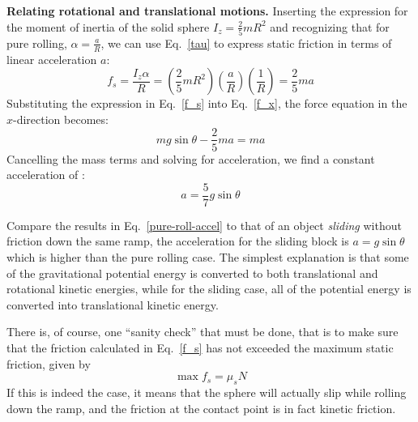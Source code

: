 \documentclass{../../../oss-handout}
\begin{document}
\textbf{Relating rotational and translational motions.} Inserting the
expression for the moment of inertia of the solid sphere
$\displaystyle I_z=\frac25 mR^2$
and recognizing that for pure rolling,
$\displaystyle\alpha=\frac{a}{R}$, we can use Eq.~\ref{tau} to express static
friction in terms of linear acceleration $a$:
\begin{equation}
  f_s=\frac{I_z\alpha}{R}=
  \left(\frac25 mR^2\right)
  \left(\frac{a}{R}\right)
  \left(\frac{1}{R}\right)=\frac25ma
  \label{f_s}
\end{equation}
Substituting the expression in Eq.~\ref{f_s} into Eq.~\ref{f_x}, the force
equation in the $x$-direction becomes:
\begin{equation}
  mg\sin\theta-\frac25 ma=ma
\end{equation}
Cancelling the mass terms and solving for acceleration, we find a constant
acceleration of :
\begin{equation}
  a=\frac57 g\sin\theta
  \label{pure-roll-accel}
\end{equation}

Compare the results in Eq.~\ref{pure-roll-accel} to that of an object
\emph{sliding} without friction down the same ramp, the acceleration for the
sliding block is $a=g\sin\theta$ which is higher than the pure rolling case.
The simplest explanation is that some of the gravitational potential energy is
converted to both translational and rotational kinetic energies, while for the
sliding case, all of the potential energy is converted into translational
kinetic energy.

There is, of course, one ``sanity check'' that must be done, that is to make
sure that the friction calculated in Eq.~\ref{f_s} has not exceeded the maximum
static friction, given by
\begin{equation}
  \max f_s=\mu_s N
\end{equation}
If this is indeed the case, it means that the sphere will actually slip while
rolling down the ramp, and the friction at the contact point is in fact kinetic
friction.
\end{document}
